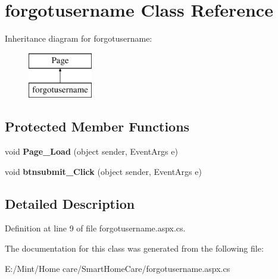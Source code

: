 \hypertarget{classforgotusername}{\section{forgotusername Class Reference}
\label{classforgotusername}
}
Inheritance diagram for forgotusername\-:\begin{figure}[H]
\begin{center}
\leavevmode
\includegraphics[height=2.000000cm]{classforgotusername}
\end{center}
\end{figure}
\subsection*{Protected Member Functions}
\begin{DoxyCompactItemize}
\item 
\hypertarget{classforgotusername_a7d92eb838d0a772f00ecd957480500bb}{void {\bfseries Page\-\_\-\-Load} (object sender, Event\-Args e)}\label{classforgotusername_a7d92eb838d0a772f00ecd957480500bb}

\item 
\hypertarget{classforgotusername_a5e5c45ac41c9ec60a2895cc1c7c2d3c4}{void {\bfseries btnsubmit\-\_\-\-Click} (object sender, Event\-Args e)}\label{classforgotusername_a5e5c45ac41c9ec60a2895cc1c7c2d3c4}

\end{DoxyCompactItemize}


\subsection{Detailed Description}


Definition at line 9 of file forgotusername.\-aspx.\-cs.



The documentation for this class was generated from the following file\-:\begin{DoxyCompactItemize}
\item 
E\-:/\-Mint/\-Home care/\-Smart\-Home\-Care/forgotusername.\-aspx.\-cs\end{DoxyCompactItemize}

